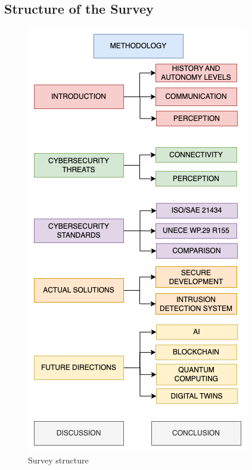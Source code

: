 \newpage
\subsection{Structure of the Survey}\label{subsec:structure-of-the-survey}
\begin{figure}[!htb]
    \centering
    \includegraphics[width=0.6\linewidth]{figures/survey-structure}
    \caption{Survey structure}
    \label{fig:survey-structure}
\end{figure}
\newpage
